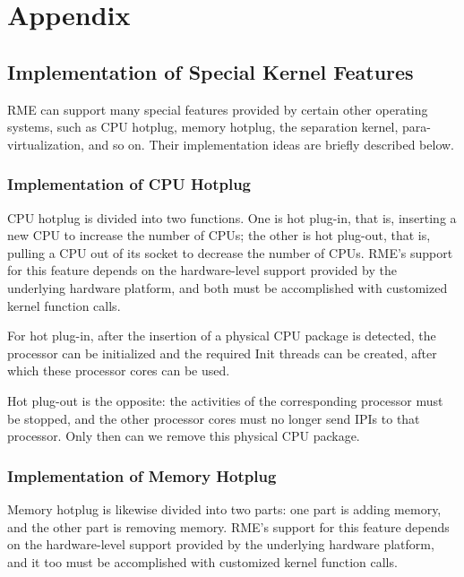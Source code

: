 \chapter{Appendix}\label{ch:appendix}

\section{Implementation of Special Kernel Features}\label{sec:9-special-kernel-features}

RME can support many special features provided by certain other operating systems, such as CPU hotplug, memory hotplug, the separation kernel, para-virtualization, and so on. Their implementation ideas are briefly described below.

\subsection{Implementation of CPU Hotplug}\label{subsec:9-cpu-hotplug}

CPU hotplug is divided into two functions. One is hot plug-in, that is, inserting a new CPU to increase the number of CPUs; the other is hot plug-out, that is, pulling a CPU out of its socket to decrease the number of CPUs. RME's support for this feature depends on the hardware-level support provided by the underlying hardware platform, and both must be accomplished with customized kernel function calls.

For hot plug-in, after the insertion of a physical CPU package is detected, the processor can be initialized and the required Init threads can be created, after which these processor cores can be used.

Hot plug-out is the opposite: the activities of the corresponding processor must be stopped, and the other processor cores must no longer send IPIs to that processor. Only then can we remove this physical CPU package.

\subsection{Implementation of Memory Hotplug}\label{subsec:9-memory-hotplug}

Memory hotplug is likewise divided into two parts: one part is adding memory, and the other part is removing memory. RME's support for this feature depends on the hardware-level support provided by the underlying hardware platform, and it too must be accomplished with customized kernel function calls.

